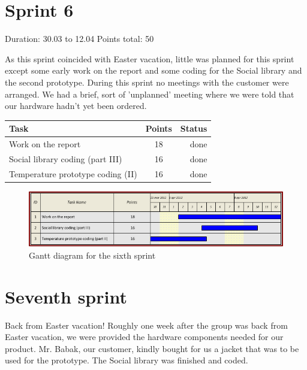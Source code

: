\newpage

\section{Sprint 6}

Duration: 30.03 to 12.04
Points total: 50

As this sprint coincided with Easter vacation, little
was planned for this sprint except some early work on the report
and some coding for the Social library and the second prototype.
During this sprint no meetings with the customer were arranged.
We had a brief, sort of 'unplanned' meeting where we were told
that our hardware hadn't yet been ordered.

\begin{table}[ht!]
\begin{tabular}{ | l | c | r | }

\hline
\textbf{Task} & \textbf{Points} & \textbf{Status} \\
\hline

Work on the report			& 18 & done \\
\hline
Social library coding (part III)	& 16 & done \\
\hline
Temperature prototype coding (II)	& 16 & done \\
\hline

\end{tabular}
\end{table}

\begin{figure}[h!]
\centering \includegraphics[scale=0.8]{img/sprints-gantt6.png}
\caption{Gantt diagram for the sixth sprint}
\label{fig:sprints-gantt6}
\end{figure}

\section{Seventh sprint}

Back from Easter vacation! Roughly one week after the group
was back from Easter vacation, we were provided the hardware components
needed for our product. Mr. Babak, our customer, kindly bought for us
a jacket that was to be used for the prototype.
The Social library was finished and coded.

